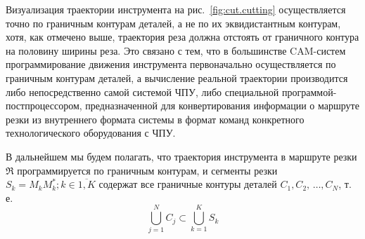 Визуализация траектории инструмента
на рис.~\ref{fig:cut.cutting}
осуществляется точно по граничным контурам деталей,
а не по их эквидистантным контурам, хотя,
как отмечено выше,
траектория реза должна отстоять от
граничного контура на половину ширины реза.
Это связано с тем, что в большинстве
CAM-систем
программирование движения инструмента первоначально
осуществляется по граничным контурам деталей,
а вычисление реальной траектории производится
либо непосредственно самой системой ЧПУ,
либо специальной программой-постпроцессором,
предназначенной для конвертирования информации о
маршруте резки из внутреннего формата системы в
формат команд конкретного технологического оборудования с ЧПУ.

В дальнейшем мы будем полагать,
что траектория инструмента в маршруте резки $\mathfrak R$
программируется по граничным контурам,
и сегменты резки
$S_k=M_kM^*_k; k \in \overline{1,K}$
содержат все граничные контуры деталей
$C_1, C_2, \,\dots, C_N$,
т. е.
$$
\bigcup_{j=1}^N C_j \subset \bigcup_{k=1}^K S_k
$$

